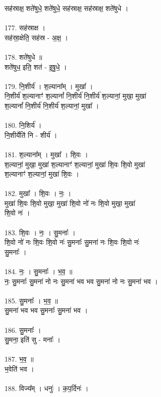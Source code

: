 सह॑स्राक्ष॒ शते॑षुधे॒ शते॑षुधे॒ सह॑स्राक्ष॒ सह॑स्राक्ष॒ शते॑षुधे ।\\
\\
177. सह॑स्राक्ष ।\\
सह॑स्रा॒क्षेति॒ सह॑स्र - अ॒क्ष॒ ।\\
\\
178. शते॑षुधे ॥\\
शते॑षुध॒ इति॒ शत॑ - इ॒षु॒धे॒ ।\\
\\
179. नि॒शीर्य॑ । श॒ल्याना᳚म् । मुखा᳚ ।\\
नि॒शीर्य॑ श॒ल्यानाꣳ॑ श॒ल्यानां᳚ नि॒शीर्य॑ नि॒शीर्य॑ श॒ल्यानां॒ मुखा॒ मुखा॑\\
श॒ल्यानां᳚ नि॒शीर्य॑ नि॒शीर्य॑ श॒ल्यानां॒ मुखा᳚ ।\\
\\
180. नि॒शिर्य॑ ।\\
नि॒शीर्येति॑ नि - शीर्य॑ ।\\
\\
181. श॒ल्याना᳚म् । मुखा᳚ । शि॒वः ।\\
श॒ल्यानां॒ मुखा॒ मुखा॑ श॒ल्यानाꣳ॑ श॒ल्यानां॒ मुखा॑ शि॒वः शि॒वो मुखा॑\\
श॒ल्यानाꣳ॑ श॒ल्यानां॒ मुखा॑ शि॒वः ।\\
\\
182. मुखा᳚ । शि॒वः । नः॒ ।\\
मुखा॑ शि॒वः शि॒वो मुखा॒ मुखा॑ शि॒वो नो॑ नः शि॒वो मुखा॒ मुखा॑\\
शि॒वो नः॑ ।\\
\\
183. शि॒वः । नः॒ । सु॒मनाः᳚ ।\\
शि॒वो नो॑ नः शि॒वः शि॒वो नः॑ सु॒मनाः᳚ सु॒मना॑ नः शि॒वः शि॒वो नः॑\\
सु॒मनाः᳚ ।\\
\\
184. नः॒ । सु॒मनाः᳚ । भ॒व॒ ॥\\
नः॒ सु॒मनाः᳚ सु॒मना॑ नो नः सु॒मना॑ भव भव सु॒मना॑ नो नः सु॒मना॑ भव ।\\
\\
185. सु॒मनाः᳚ । भ॒व॒ ॥\\
सु॒मना॑ भव भव सु॒मनाः᳚ सु॒मना॑ भव ।\\
\\
186. सु॒मनाः᳚ ।\\
सु॒मना॒ इति॑ सु - मनाः᳚ ।\\
\\
187. भ॒व॒ ॥\\
भ॒वेति॑ भव ।\\
\\
188. विज्य᳚म् । धनुः॑ । क॒प॒र्दिनः॑ ।\\
